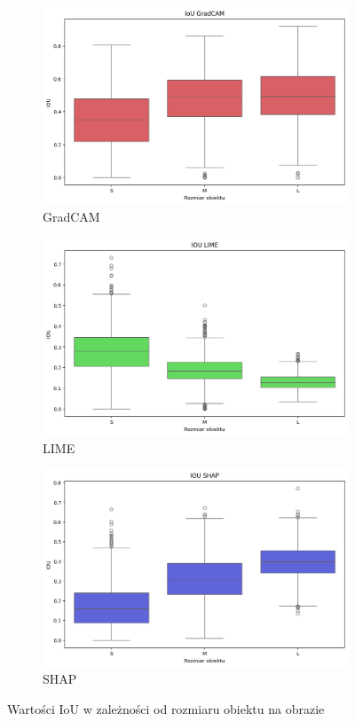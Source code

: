 \begin{figure}[h]
	\centering
	\begin{subfigure}[b]{0.3\textwidth}
		\centering\includegraphics[width=.9\textwidth]{img/size_iou_gradcam}
		\caption{GradCAM}  \label{rys:size_iou_gradcam}
	\end{subfigure}
	\begin{subfigure}[b]{0.3\textwidth}
		\centering\includegraphics[width=.9\textwidth]{img/size_iou_lime}
		\caption{LIME}  \label{rys:size_iou_lime}
	\end{subfigure}
	\begin{subfigure}[b]{0.3\textwidth}
		\centering\includegraphics[width=.9\textwidth]{img/size_iou_shap}
		\caption{SHAP}  \label{rys:size_iou_shap}
	\end{subfigure}
	\caption{Wartości IoU w zależności od rozmiaru obiektu na obrazie}
	\label{rys:size_iou}
\end{figure}

